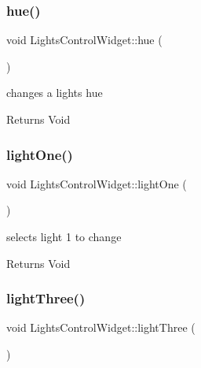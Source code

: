 \subsubsection{\texorpdfstring{hue()}{hue()}}
{\footnotesize\ttfamily void Lights\+Control\+Widget\+::hue (\begin{DoxyParamCaption}{ }\end{DoxyParamCaption})\hspace{0.3cm}{\ttfamily [private]}}



changes a light\textquotesingle{}s hue 

\begin{DoxyReturn}{Returns}
Void 
\end{DoxyReturn}
\mbox{\label{class_lights_control_widget_aedb19ca01377b31ba326bd0e0f82138d}} 
\subsubsection{\texorpdfstring{light\+One()}{lightOne()}}
{\footnotesize\ttfamily void Lights\+Control\+Widget\+::light\+One (\begin{DoxyParamCaption}{ }\end{DoxyParamCaption})\hspace{0.3cm}{\ttfamily [private]}}



selects light 1 to change 

\begin{DoxyReturn}{Returns}
Void 
\end{DoxyReturn}
\mbox{\label{class_lights_control_widget_a670eae4637f1cc78febb3a751e4272dc}} 
\subsubsection{\texorpdfstring{light\+Three()}{lightThree()}}
{\footnotesize\ttfamily void Lights\+Control\+Widget\+::light\+Three (\begin{DoxyParamCaption}{ }\end{DoxyParamCaption})\hspace{0.3cm}{\ttfamily [private]}}



